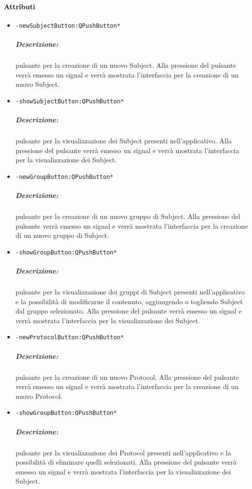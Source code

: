 \paragraph{\textcolor{black}{Attributi\\}}
\begin{itemize}
\item \color{teal}\verb!-newSubjectButton:QPushButton*!
\color{black}
\subparagraph{Descrizione: }pulsante per la creazione di un nuovo Subject\g{}. Alla pressione del pulsante verrà emesso un signal\g{} e verrà mostrata l'interfaccia per la creazione di un nuovo Subject\g{}.
 
\item \color{teal}\verb!-showSubjectButton:QPushButton*!
\color{black}
\subparagraph{Descrizione: }pulsante per la visualizzazione dei Subject\g{} presenti nell'applicativo. Alla pressione del pulsante verrà emesso un signal\g{} e verrà mostrata l'interfaccia per la visualizzazione dei Subject\g{}.

\item\color{teal}\verb!-newGroupButton:QPushButton*!
\color{black}
\subparagraph{Descrizione: }pulsante per la creazione di un nuovo gruppo di Subject\g{}. Alla pressione del pulsante verrà emesso un signal\g{} e verrà mostrata l'interfaccia per la creazione di un nuovo gruppo di Subject\g{}.

\item\color{teal}\verb!-showGroupButton:QPushButton*!
\color{black}
\subparagraph{Descrizione: }pulsante per la visualizzazione dei gruppi di Subject\g{} presenti nell'applicativo e la possibilità di modificarne il contenuto, aggiungendo o togliendo Subject\g{} dal gruppo selezionato. Alla pressione del pulsante verrà emesso un signal\g{} e verrà mostrata l'interfaccia per la visualizzazione dei Subject\g{}.

\item\color{teal}\verb!-newProtocolButton:QPushButton*!
\color{black}
\subparagraph{Descrizione: }pulsante per la creazione di un nuovo Protocol\g{}. Alla pressione del pulsante verrà emesso un signal\g{} e verrà mostrata l'interfaccia per la creazione di un nuovo Protocol\g{}.
 
\item\color{teal}\verb!-showGroupButton:QPushButton*!
\color{black}
\subparagraph{Descrizione: }pulsante per la visualizzazione dei Protocol\g{} presenti nell'applicativo e la possibilità di eliminare quelli selezionati. Alla pressione del pulsante verrà emesso un signal\g{} e verrà mostrata l'interfaccia per la visualizzazione dei Subject\g{}.


\end{itemize}
